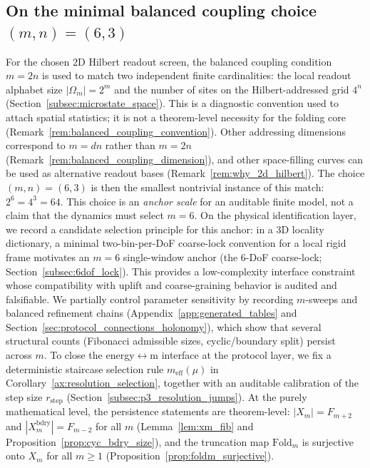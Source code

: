 \subsection{On the minimal balanced coupling choice \texorpdfstring{$(m,n)=(6,3)$}{(m,n)=(6,3)}}
For the chosen $2$D Hilbert readout screen, the balanced coupling condition $m=2n$ is used to match two independent finite cardinalities:
the local readout alphabet size $|\Omega_m|=2^m$ and the number of sites on the Hilbert-addressed grid $4^n$ (Section~\ref{subsec:microstate_space}).
This is a diagnostic convention used to attach spatial statistics; it is not a theorem-level necessity for the folding core (Remark~\ref{rem:balanced_coupling_convention}).
Other addressing dimensions correspond to $m=dn$ rather than $m=2n$ (Remark~\ref{rem:balanced_coupling_dimension}), and other space-filling curves can be used as alternative readout bases (Remark~\ref{rem:why_2d_hilbert}).
The choice $(m,n)=(6,3)$ is then the smallest nontrivial instance of this match:
$2^6=4^3=64$.
This choice is an \emph{anchor scale} for an auditable finite model, not a claim that the dynamics must select $m=6$.
On the physical identification layer, we record a candidate selection principle for this anchor: in a $3$D locality dictionary, a minimal two-bin-per-DoF coarse-lock convention for a local rigid frame motivates an $m=6$ single-window anchor (the 6-DoF coarse-lock; Section~\ref{subsec:6dof_lock}).
This provides a low-complexity interface constraint whose compatibility with uplift and coarse-graining behavior is audited and falsifiable.
We partially control parameter sensitivity by recording $m$-sweeps and balanced refinement chains (Appendix~\ref{app:generated_tables} and Section~\ref{sec:protocol_connections_holonomy}), which show that several structural counts (Fibonacci admissible sizes, cyclic/boundary split) persist across $m$.
To close the energy$\leftrightarrow$m interface at the protocol layer, we fix a deterministic staircase selection rule $m_{\mathrm{eff}}(\mu)$ in Corollary~\ref{ax:resolution_selection}, together with an auditable calibration of the step size $r_{\mathrm{step}}$ (Section~\ref{subsec:p3_resolution_jumps}).
At the purely mathematical level, the persistence statements are theorem-level: $|X_m|=F_{m+2}$ and $|X_m^{\mathrm{bdry}}|=F_{m-2}$ for all $m$ (Lemma~\ref{lem:xm_fib} and Proposition~\ref{prop:cyc_bdry_size}), and the truncation map $\mathrm{Fold}_m$ is surjective onto $X_m$ for all $m\ge 1$ (Proposition~\ref{prop:foldm_surjective}).

